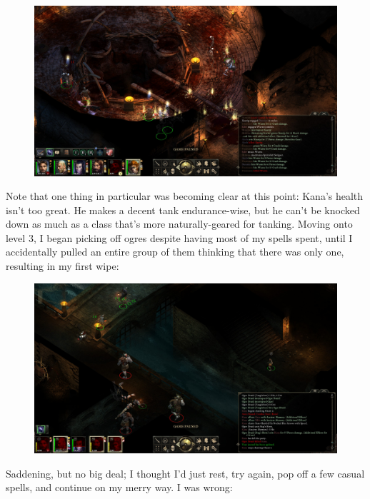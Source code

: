 \documentclass{article}
\begin{document}
\begin{figure}
\includegraphics[scale=0.33]{files/blog/2018_06_16_pillars_of_eternity_path_of_the_damned_act_i/2018_06_16_l2_xariups_after.jpg}
\end{figure}

Note that one thing in particular was becoming clear at this point: Kana's health isn't too great.  He makes a decent tank endurance-wise, but he can't be knocked down as much as a class that's more naturally-geared for tanking.  Moving onto level 3, I began picking off ogres despite having most of my spells spent, until I accidentally pulled an entire group of them thinking that there was only one, resulting in my first wipe:

\begin{figure}
\includegraphics[scale=0.33]{files/blog/2018_06_16_pillars_of_eternity_path_of_the_damned_act_i/2018_06_16_l3_ogre_wipe1.jpg}
\end{figure}

Saddening, but no big deal; I thought I'd just rest, try again, pop off a few casual spells, and continue on my merry way.  I was wrong:
\end{document}
